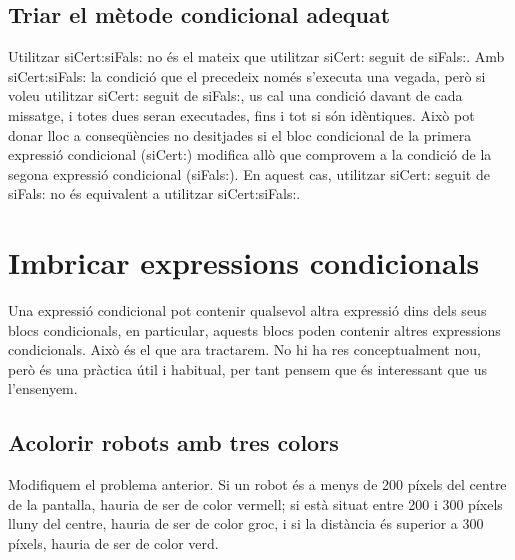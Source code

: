 \subsection{Triar el mètode condicional adequat}
Utilitzar \textsf{siCert:siFals:} no és el mateix que utilitzar \textsf{siCert:} seguit de \textsf{siFals:}. Amb  \textsf{siCert:siFals:} la condició que el precedeix només s'executa una vegada, però si voleu utilitzar \textsf{siCert:} seguit de \textsf{siFals:}, us cal una condició davant de cada missatge, i totes dues seran executades, fins i tot si són idèntiques. Això pot donar lloc a conseqüències no desitjades si el bloc condicional de la primera expressió condicional (\textsf{siCert:}) modifica allò que comprovem a la condició de la segona expressió condicional  (\textsf{siFals:}). En aquest cas, utilitzar \textsf{siCert:} seguit de \textsf{siFals:} no és equivalent a utilitzar \textsf{siCert:siFals:}.

\section{Imbricar expressions condicionals}
Una expressió condicional pot contenir qualsevol altra expressió dins dels seus blocs condicionals, en particular, aquests blocs poden contenir altres expressions condicionals. Això és el que ara tractarem. No hi ha res conceptualment nou, però és una pràctica útil i habitual, per tant pensem que és interessant que us l'ensenyem.

\subsection{Acolorir robots amb tres colors}
Modifiquem el problema anterior. Si un robot és a menys de 200 píxels del centre de la pantalla, hauria de ser de color vermell; si està situat entre 200 i 300 píxels lluny del centre, hauria de ser de color groc, i si la distància és superior a 300 píxels, hauria de ser de color verd.

